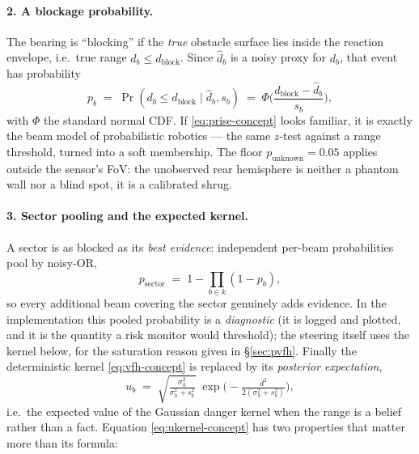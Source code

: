 \paragraph{2. A blockage probability.} The bearing is ``blocking'' if the
\emph{true} obstacle surface lies inside the reaction envelope, i.e.\ true
range $d_b \le d_{\mathrm{block}}$. Since $\hat d_b$ is a noisy proxy for
$d_b$, that event has probability
\begin{equation}
p_b \;=\; \Pr(d_b \le d_{\mathrm{block}} \mid \hat d_b, s_b)
       \;=\; \Phi\!\Big(\frac{d_{\mathrm{block}} - \hat d_b}{s_b}\Big),
\label{eq:prise-concept}
\end{equation}
with $\Phi$ the standard normal CDF. If \eqref{eq:prise-concept} looks
familiar, it is exactly the beam model of probabilistic robotics
\cite{thrun2005} --- the same $z$-test against a range threshold, turned
into a soft membership. The floor $p_{\mathrm{unknown}} = 0.05$ applies
outside the sensor's FoV: the unobserved rear hemisphere is neither a phantom
wall nor a blind spot, it is a calibrated shrug.

\paragraph{3. Sector pooling and the expected kernel.} A sector is as
blocked as its \emph{best evidence}: independent per-beam probabilities pool
by noisy-OR,
\begin{equation}
p_{\mathrm{sector}} \;=\; 1 - \prod_{b \in k} (1 - p_b),
\label{eq:noisyor-concept}
\end{equation}
so every additional beam covering the sector genuinely adds evidence. In
the implementation this pooled probability is a \emph{diagnostic} (it is
logged and plotted, and it is the quantity a risk monitor would threshold);
the steering itself uses the kernel below, for the saturation reason given
in \S\ref{sec:pvfh}. Finally the deterministic kernel \eqref{eq:vfh-concept} is replaced by its
\emph{posterior expectation},
\begin{equation}
u_b \;=\; \sqrt{\tfrac{\sigma_h^2}{\sigma_h^2 + s_b^2}}\;
        \exp\!\Big(\!-\tfrac{d^2}{2(\sigma_h^2 + s_b^2)}\Big),
\label{eq:ukernel-concept}
\end{equation}
i.e.\ the expected value of the Gaussian danger kernel when the range is a
belief rather than a fact. Equation \eqref{eq:ukernel-concept} has two
properties that matter more than its formula:

